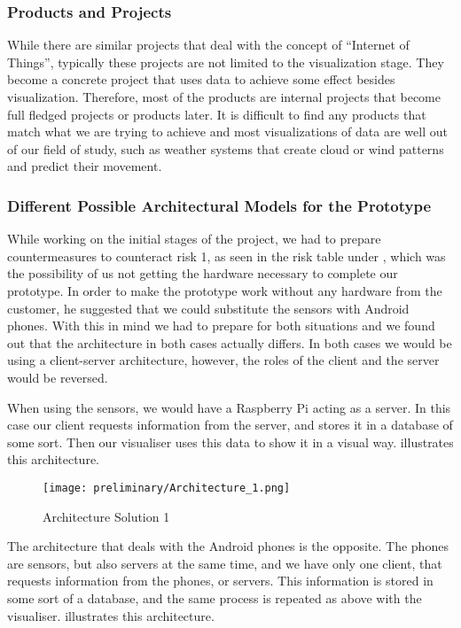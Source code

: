 \documentclass[../document]{subfiles}
\begin{document}
\subsubsection{Products and Projects}
While there are similar projects that deal with the concept of “Internet of Things”, typically these projects are not limited to the visualization stage. They become a concrete project that uses data to achieve some effect besides visualization. Therefore, most of the products are internal projects that become full fledged projects or products later. It is difficult to find any products that match what we are trying to achieve and most visualizations of data are well out of our field of study, such as weather systems that create cloud or wind patterns and predict their movement.

\subsubsection{Different Possible Architectural Models for the Prototype}
While working on the initial stages of the project, we had to prepare countermeasures to counteract risk 1, as seen in the risk table under , which was the possibility of us not getting the hardware necessary to complete our prototype. In order to make the prototype work without any hardware from the customer, he suggested that we could substitute the sensors with \gls{Android} phones. With this in mind we had to prepare for both situations and we found out that the architecture in both cases actually differs. In both cases we would be using a client-server architecture, however, the roles of the client and the server would be reversed.

When using the sensors, we would have a \gls{Raspberry Pi} acting as a server. In this case our client requests information from the server, and stores it in a database of some sort. Then our visualiser uses this data to show it in a visual way.  illustrates this architecture.

\begin{figure}[H]
	\texttt{[image: preliminary/Architecture\_1.png]}
	\caption{Architecture Solution 1}
	\label{fig:Architecture_1}
\end{figure}

The architecture that deals with the \gls{Android} phones is the opposite. The phones are sensors, but also servers at the same time, and we have only one client, that requests information from the phones, or servers. This information is stored in some sort of a database, and the same process is repeated as above with the visualiser.  illustrates this architecture.
\end{document}
